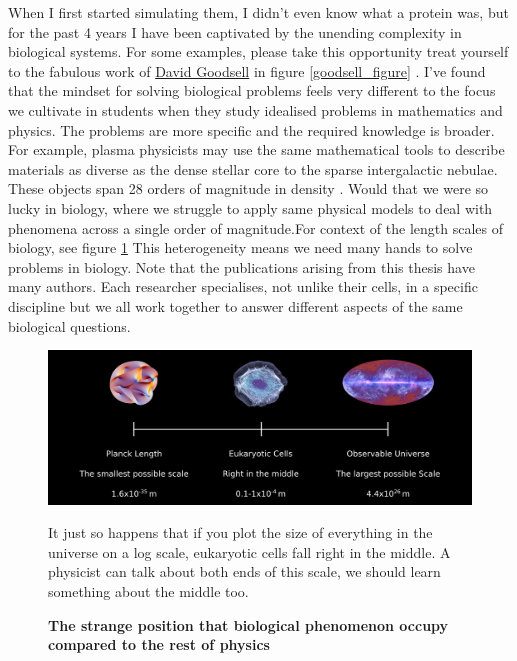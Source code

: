 When I first started simulating them, I didn't even know what a protein was, but for the past 4 years I have been captivated by the unending complexity in biological systems. For some examples, please take this opportunity treat yourself to the fabulous work of \href {https://pdb101.rcsb.org/sci-art/goodsell-gallery}{David Goodsell} in figure \ref{goodsell_figure} . I've found that the mindset for solving biological problems feels very different to the focus we cultivate in students when they study idealised problems in mathematics and physics. The problems are more specific and the required knowledge is broader. For example, plasma physicists may use the same mathematical tools to describe materials as diverse as the dense stellar core to the sparse intergalactic nebulae. These objects span 28 orders of magnitude in density \cite{chen2018}. Would that we were so lucky in biology, where we struggle to apply same physical models to deal with phenomena across a single order of magnitude.For context of the length scales of biology, see figure \ref{length_scales} This heterogeneity means we need many hands to solve problems in biology. Note that the publications arising from this thesis have many authors. Each researcher specialises, not unlike their cells, in a specific discipline but we all work together to answer different aspects of the same biological questions.

\begin{figure}
	\begin{center}
		\includegraphics[width=1.0\textwidth]{figures/scales.png}
	\end{center}
	\captionsetup{singlelinecheck = false, justification=raggedright}
	\caption[The strange position that biological phenomenon occupy compared to the rest of physics] {\textbf{The strange position that biological phenomenon occupy compared to the rest of physics}}{It just so happens that if you plot the size of everything  in the universe on a log scale, eukaryotic cells fall right in the middle. A physicist can talk about both ends of this scale, we should learn something about the middle too.}
	\label{length_scales}
\end{figure}

